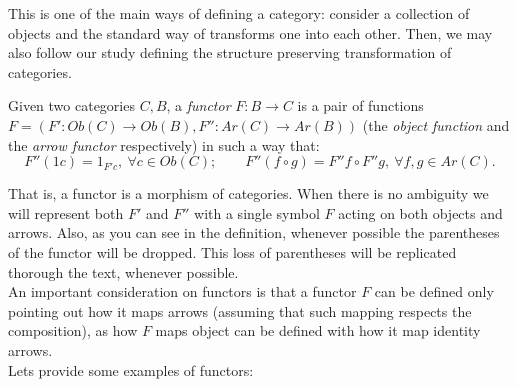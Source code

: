 This is one of the main ways of defining a category: consider a collection of objects and the standard way of transforms one into each other. Then, we may also follow our study defining the structure preserving transformation of categories.

\begin{definition}
  Given two categories $C, B$, a \emph{functor} $F: B \to C$ is a pair of functions $F=(F':Ob(C)\to Ob(B),F'':Ar(C)\to Ar(B))$ (the \emph{object function} and the \emph{arrow functor} respectively) in such a way that:
  $$F''(1c) = 1_{F'c}, \ \forall c \in Ob(C); \qquad F''(f\circ g) = F''f \circ F''g, \ \forall f,g  \in Ar(C).$$

\end{definition}


That is,  a functor is a morphism of categories. When there is no ambiguity we will represent both $F'$ and $F''$ with a single symbol $F$ acting on both objects and arrows. Also, as you can see in the definition, whenever possible the parentheses of the functor will be dropped. This loss of parentheses will be replicated thorough the text, whenever possible.\\



An  important consideration on functors is that a functor $F$ can be defined only pointing out how it maps arrows (assuming that such mapping respects the composition), as how $F$ maps object can be defined with how it map identity arrows.\\

Lets provide some examples of functors:\\



